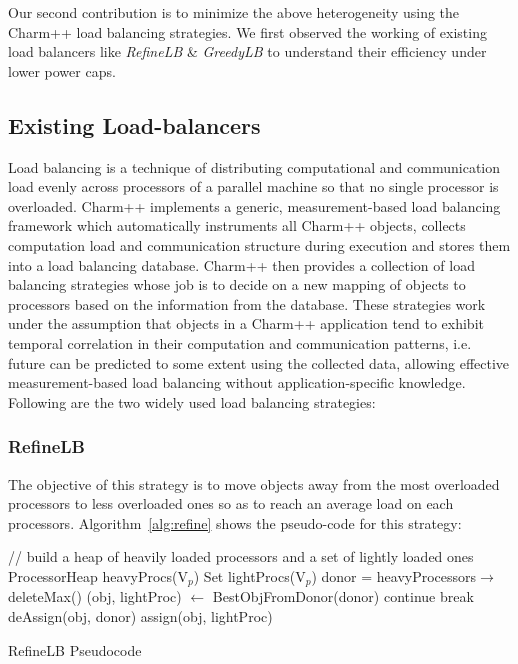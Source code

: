 Our second contribution is to minimize the above heterogeneity using the
Charm++ load balancing strategies.  We first observed the working of existing load
balancers like \emph{RefineLB} \& \emph{GreedyLB} to 
understand their efficiency under lower power caps.

\subsection{Existing Load-balancers} 
Load balancing is a technique of distributing computational and communication
load evenly across processors of a parallel machine so that no single processor
is overloaded.  Charm++ implements a generic, measurement-based load balancing
framework which automatically instruments all Charm++ objects, collects
computation load and communication structure during execution and stores them
into a load balancing database.  Charm++ then provides a collection of load
balancing strategies whose job is to decide on a new mapping of objects to
processors based on the information from the database.  These strategies work
under the assumption that objects in a Charm++ application tend to exhibit
temporal correlation in their computation and communication patterns, i.e.
future can be predicted to some extent using the collected data, allowing
effective measurement-based load balancing without application-specific
knowledge. Following are the two widely used load balancing strategies:

\subsubsection{RefineLB}
The objective of this strategy is to move objects away from the most overloaded
processors to less overloaded ones so as to reach an average load on each
processors. Algorithm~\ref{alg:refine} shows the pseudo-code for this strategy:

\begin{algorithm}
  // build a heap of heavily loaded processors and a set of lightly loaded ones\;
  ProcessorHeap heavyProcs(V$_p$)\;
  Set lightProcs(V$_p$)\; 
   {
    donor =   heavyProcessors$\rightarrow$deleteMax()\;
     {
      (obj, lightProc)  $\leftarrow$ BestObjFromDonor(donor)\;
       {
        continue\;
      } 
       {
        break\;
      }
      deAssign(obj, donor)\;
      assign(obj, lightProc)\;
    }
  }
 \caption{RefineLB Pseudocode}
 \label{alg:refine}
\end{algorithm}

